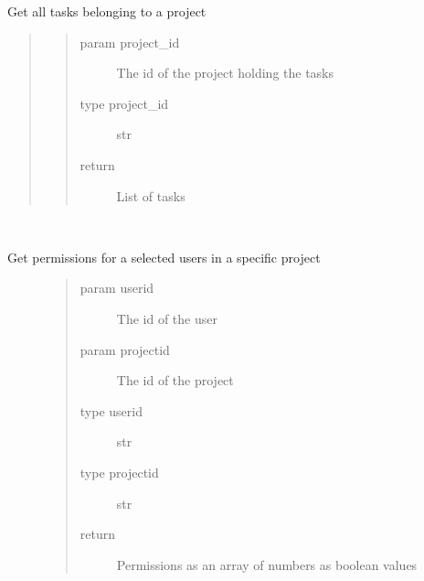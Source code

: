 \documentclass[letterpaper,10pt,english]{sphinxmanual}
\begin{document}
\begin{fulllineitems}
\label{\detokenize{index:models.project.get_tasks_by_project_id}}
Get all tasks belonging to a project
\begin{quote}
\begin{quote}\begin{description}
\item[{param project\_id}] \leavevmode
The id of the project holding the tasks

\item[{type project\_id}] \leavevmode
str

\item[{return}] \leavevmode
List of tasks

\end{description}\end{quote}
\end{quote}

\end{fulllineitems}


\begin{fulllineitems}
\label{\detokenize{index:models.project.get_user_permissions}}~\begin{description}
\item[{Get permissions for a selected users in a specific project}] \leavevmode\begin{quote}\begin{description}
\item[{param userid}] \leavevmode
The id of the user

\item[{param projectid}] \leavevmode
The id of the project

\item[{type userid}] \leavevmode
str

\item[{type projectid}] \leavevmode
str

\item[{return}] \leavevmode
Permissions as an array of numbers as boolean values

\end{description}\end{quote}

\end{description}

\end{fulllineitems}
\end{document}
